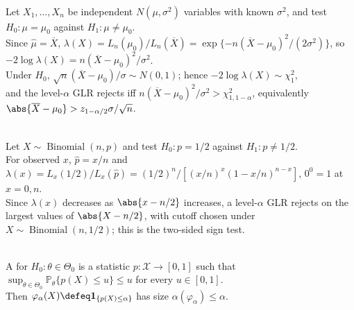 \begin{example} \label{ex:normal-mean-glrt-known-variance} \\
Let $X_1,\ldots,X_n$ be independent $N(\mu,\sigma^2)$ variables with known $\sigma^2$, and test $H_0:\mu=\mu_0$ against $H_1:\mu\neq\mu_0$.\\
Since $\widehat{\mu}=\overline{X}$, $\lambda(X)=L_n(\mu_0)/L_n(\overline{X})=\exp\{-n(\overline{X}-\mu_0)^2/(2\sigma^2)\}$, so $-2\log\lambda(X)=n(\overline{X}-\mu_0)^2/\sigma^2$.\\
Under $H_0$, $\sqrt n(\overline{X}-\mu_0)/\sigma\sim N(0,1)$; hence $-2\log\lambda(X)\sim\chi_1^2$,\\
and the level-$\alpha$ GLR rejects iff $n(\overline{X}-\mu_0)^2/\sigma^2>\chi^2_{1,1-\alpha}$, equivalently $\abs{\overline{X}-\mu_0}>z_{1-\alpha/2}\sigma/\sqrt n$.
\end{example}

\begin{example} \label{ex:sign-test-binomial-glrt} \\
Let $X\sim\operatorname{Binomial}(n,p)$ and test $H_0:p=1/2$ against $H_1:p\neq1/2$.\\
For observed $x$, $\widehat p=x/n$ and $\lambda(x)=L_x(1/2)/L_x(\widehat p)=(1/2)^n/[(x/n)^x(1-x/n)^{n-x}]$, $0^0=1$ at $x=0,n$.\\
Since $\lambda(x)$ decreases as $\abs{x-n/2}$ increases, a level-$\alpha$ GLR rejects on the largest values of $\abs{X-n/2}$, with cutoff chosen under $X\sim\operatorname{Binomial}(n,1/2)$; this is the two-sided sign test.
\end{example}

\begin{definition} \label{def:p-value-and-validity} \\
A  for $H_0:\theta\in\Theta_0$ is a statistic $p:\mathcal{X}\to[0,1]$ such that $\sup_{\theta\in\Theta_0}\mathbb{P}_\theta\{p(X)\leq u\}\leq u$ for every $u\in[0,1]$.\\
Then $\varphi_\alpha(X)\defeq\mathbf{1}_{\{p(X)\leq\alpha\}}$ has size $\alpha(\varphi_\alpha)\leq\alpha$.
\end{definition}

